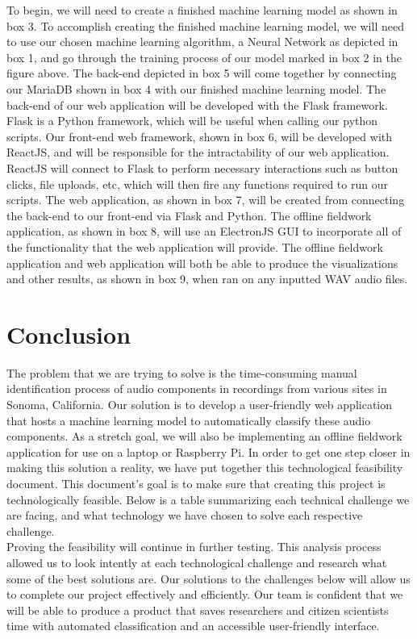 \documentclass[12pt,journal,compsoc]{IEEEtran}
\begin{document}
\noindent To begin, we will need to create a finished machine learning model as shown in box 3. To accomplish creating the finished machine learning model, we will need to use our chosen machine learning algorithm, a Neural Network as depicted in box 1, and go through the training process of our model marked in box 2 in the figure above. The back-end depicted in box 5 will come together by connecting our MariaDB shown in box 4 with our finished machine learning model. The back-end of our web application will be developed with the Flask framework. Flask is a Python framework, which will be useful when calling our python scripts. Our front-end web framework, shown in box 6, will be developed with ReactJS, and will be responsible for the intractability of our web application. ReactJS will connect to Flask to perform necessary interactions such as button clicks, file uploads, etc, which will then fire any functions required to run our scripts. The web application, as shown in box 7, will be created from connecting the back-end to our front-end via Flask and Python. The offline fieldwork application, as shown in box 8, will use an ElectronJS GUI to incorporate all of the functionality that the web application will provide. The offline fieldwork application and web application will both be able to produce the visualizations and other results, as shown in box 9, when ran on any inputted WAV audio files. 

\section{Conclusion}
The problem that we are trying to solve is the time-consuming manual identification process of audio components in recordings from various sites in Sonoma, California. Our solution is to develop a user-friendly web application that hosts a machine learning model to automatically classify these audio components. As a stretch goal, we will also be implementing an offline fieldwork application for use on a laptop or Raspberry Pi. In order to get one step closer in making this solution a reality, we have put together this technological feasibility document. This document’s goal is to make sure that creating this project is technologically feasible. Below is a table summarizing each technical challenge we are facing, and what technology we have chosen to solve each respective challenge.\\

\noindent Proving the feasibility will continue in further testing. This analysis process allowed us to look intently at each technological challenge and research what some of the best solutions are. Our solutions to the challenges below will allow us to complete our project effectively and efficiently. Our team is confident that we will be able to produce a product that saves researchers and citizen scientists time with automated classification and an accessible user-friendly interface.
\end{document}
